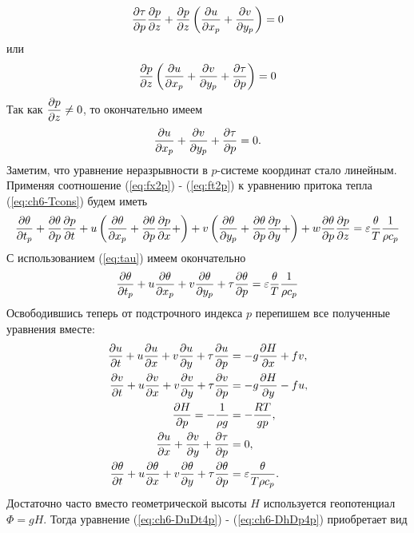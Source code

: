    \begin{equation*}
       \pd{\tau}{p}\pd{p}{z} + \pd{p}{z} \left( \pd{u}{x_p} + \pd{v}{y_p} \right) = 0
   \end{equation*}
   или
   \begin{equation*}
       \pd{p}{z} \left( \pd{u}{x_p} + \pd{v}{y_p} + \pd{\tau}{p}  \right) = 0
   \end{equation*}
   Так как $\pd{p}{z}\neq0$, то окончательно имеем
   \begin{equation}
       \pd{u}{x_p} + \pd{v}{y_p} + \pd{\tau}{p} = 0.
   \end{equation}
   Заметим, что уравнение неразрывности в $p$-системе координат стало линейным. Применяя соотношение (\ref{eq:fx2p}) - (\ref{eq:ft2p}) к уравнению притока тепла (\ref{eq:ch6-Tcons}) будем иметь
   \begin{multline*}
        \pd{\theta}{t_p} + 
        \pd{\theta}{p}\pd{p}{t}+u \left( \pd{\theta}{x_p} + \pd{\theta}{p}\pd{p}{x} + \right) + 
        v \left( \pd{\theta}{y_p} + \pd{\theta}{p}\pd{p}{y} + \right) + 
        w \pd{\theta}{p}\pd{p}{z} = \varepsilon\frac{\theta}{T}\frac{1}{\rho c_p}
   \end{multline*}
   С использованием (\ref{eq:tau}) имеем окончательно 
   \begin{equation}
       \label{eq:cp6-Tcons4p}
       \pd{\theta}{t_p} + u\pd{\theta}{x_p} + v\pd{\theta}{y_p} + \tau \pd{\theta}{p} = \varepsilon\frac{\theta}{T}\frac{1}{\rho c_p}
   \end{equation}
   Освободившись теперь от подстрочного индекса $p$ перепишем все полученные уравнения вместе:
   \begin{align}
        \pd{u}{t}+u\pd{u}{x}+v\pd{u}{y}+\tau\pd{u}{p} &= - g \pd{H}{x}+fv, \label{eq:ch6-DuDt4p} \\
        \pd{v}{t}+u\pd{v}{x}+v\pd{v}{y}+\tau\pd{v}{p} &= - g \pd{H}{y}-fu, \label{eq:ch6-DvDt4p} \\
        \pd{H}{p}=-\frac{1}{\rho g}&=-\frac{RT}{gp}, \label{eq:ch6-DhDp4p}\\
        \pd{u}{x} + \pd{v}{y} + \pd{\tau}{p} &= 0, \label{eq:ch6-masscons4p}\\
        \pd{\theta}{t} + u\pd{\theta}{x} + v\pd{\theta}{y} + \tau \pd{\theta}{p} &= \varepsilon\frac{\theta}{T \rho c_p}. \label{eq:ch6-DthetaDt4p}
   \end{align}
   Достаточно часто вместо геометрической высоты $H$ используется геопотенциал $\Phi=gH$. Тогда уравнение (\ref{eq:ch6-DuDt4p}) - (\ref{eq:ch6-DhDp4p}) приобретает вид
